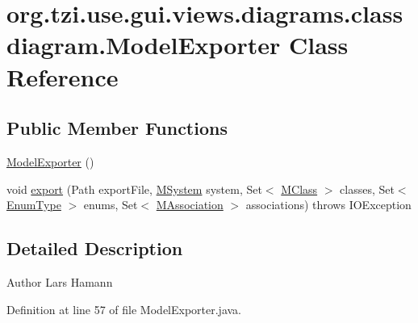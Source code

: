 \hypertarget{classorg_1_1tzi_1_1use_1_1gui_1_1views_1_1diagrams_1_1classdiagram_1_1_model_exporter}{\section{org.\-tzi.\-use.\-gui.\-views.\-diagrams.\-classdiagram.\-Model\-Exporter Class Reference}
\label{classorg_1_1tzi_1_1use_1_1gui_1_1views_1_1diagrams_1_1classdiagram_1_1_model_exporter}
}
\subsection*{Public Member Functions}
\begin{DoxyCompactItemize}
\item 
\hyperlink{classorg_1_1tzi_1_1use_1_1gui_1_1views_1_1diagrams_1_1classdiagram_1_1_model_exporter_a2d2c5bc471fac83cf2ecac4689cbd43e}{Model\-Exporter} ()
\item 
void \hyperlink{classorg_1_1tzi_1_1use_1_1gui_1_1views_1_1diagrams_1_1classdiagram_1_1_model_exporter_aed63216819ea38c96a08773eac903d9c}{export} (Path export\-File, \hyperlink{classorg_1_1tzi_1_1use_1_1uml_1_1sys_1_1_m_system}{M\-System} system, Set$<$ \hyperlink{interfaceorg_1_1tzi_1_1use_1_1uml_1_1mm_1_1_m_class}{M\-Class} $>$ classes, Set$<$ \hyperlink{classorg_1_1tzi_1_1use_1_1uml_1_1ocl_1_1type_1_1_enum_type}{Enum\-Type} $>$ enums, Set$<$ \hyperlink{interfaceorg_1_1tzi_1_1use_1_1uml_1_1mm_1_1_m_association}{M\-Association} $>$ associations)  throws I\-O\-Exception 
\end{DoxyCompactItemize}


\subsection{Detailed Description}
\begin{DoxyAuthor}{Author}
Lars Hamann 
\end{DoxyAuthor}


Definition at line 57 of file Model\-Exporter.\-java.



